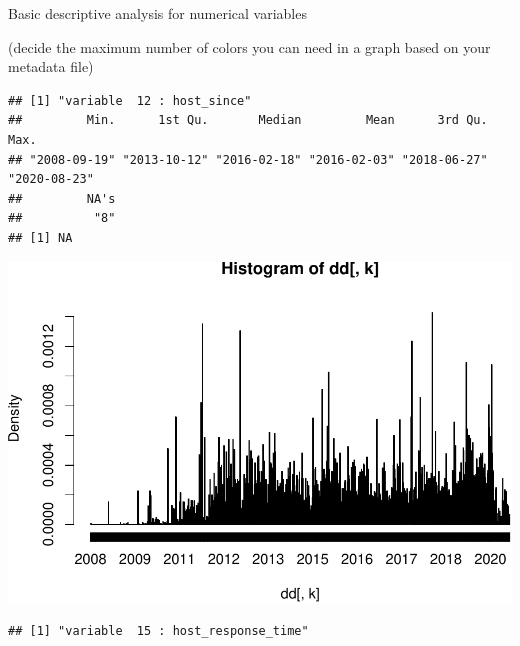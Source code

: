 Basic descriptive analysis for numerical variables

(decide the maximum number of colors you can need in a graph based on
your metadata file)

\begin{verbatim}
## [1] "variable  12 : host_since"
##         Min.      1st Qu.       Median         Mean      3rd Qu.         Max. 
## "2008-09-19" "2013-10-12" "2016-02-18" "2016-02-03" "2018-06-27" "2020-08-23" 
##         NA's 
##          "8" 
## [1] NA
\end{verbatim}

\includegraphics{anal_files/figure-latex/unnamed-chunk-7-1.pdf}

\begin{verbatim}
## [1] "variable  15 : host_response_time"
\end{verbatim}


